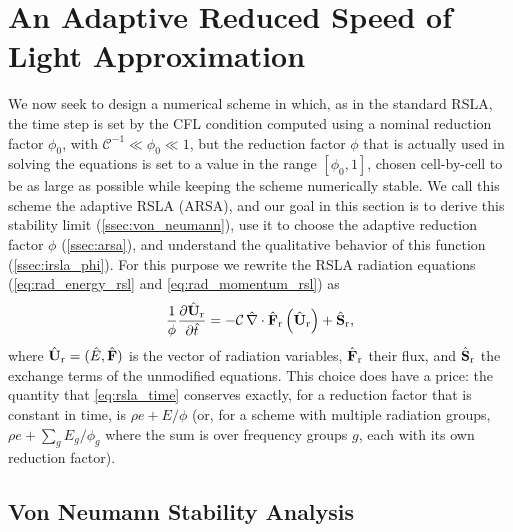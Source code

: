 \documentclass[preprint,12pt,authoryear]{elsarticle}
\newcommand{\hatt}{\hat{t}}
\newcommand{\hE}{\hat{E}}
\newcommand{\hnabla}{\hat{\nabla}}
\newcommand{\hvecF}{\hat{\mathbf{F}}}
\newcommand{\hvecU}{{\hat{\mathbf{U}}}}
\newcommand{\hvecS}{\hat{\mathbf{S}}}
\newcommand{\calC}{\mathcal{C}}
\begin{document}
\section{An Adaptive Reduced Speed of Light Approximation}
\label{sec:irsla}

We now seek to design a numerical scheme in which, as in the standard RSLA, the time step is set by the CFL condition computed using a nominal reduction factor $\phi_0$, with $\calC^{-1} \ll \phi_0 \ll 1$, but the reduction factor $\phi$ that is actually used in solving the equations is set to a value in the range $[\phi_0,1]$, chosen cell-by-cell to be as large as possible while keeping the scheme numerically stable. We call this scheme the adaptive RSLA (ARSA), and our goal in this section is to derive this stability limit (\autoref{ssec:von_neumann}), use it to choose the adaptive reduction factor $\phi$ (\autoref{ssec:arsa}), and understand the qualitative behavior of this function (\autoref{ssec:irsla_phi}).
For this purpose we rewrite the RSLA radiation equations (\autoref{eq:rad_energy_rsl} and \autoref{eq:rad_momentum_rsl}) as
\begin{equation}
    \frac{1}{\phi}\frac{\partial \hvecU_{\rm r}}{\partial \hatt} = -\calC\,\hnabla\cdot\hvecF_{\rm r}\left(\hvecU_{\rm r}\right) + \hvecS_{\rm r},
    \label{eq:rsla_time}
\end{equation}
where $\hvecU_{\rm r} = (\hE, \hvecF)$ is the vector of radiation variables, $\hvecF_{\rm r}$ their flux, and $\hvecS_{\rm r}$ the exchange terms of the unmodified equations.
This choice does have a price: the quantity that \autoref{eq:rsla_time} conserves exactly, for a reduction factor that is constant in time, is $\rho e + E/\phi$ (or, for a scheme with multiple radiation groups, $\rho e + \sum_g E_g/\phi_g$ where the sum is over frequency groups $g$, each with its own reduction factor).

\subsection{Von Neumann Stability Analysis}
\label{ssec:von_neumann}
\end{document}
